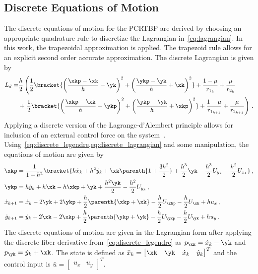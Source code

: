 \subsection{Discrete Equations of Motion}
The discrete equations of motion for the PCRTBP are derived by choosing an appropriate quadrature rule to discretize the Lagrangian in~\cref{eq:lagrangian}. 
In this work, the trapezoidal approximation is applied.
The trapezoid rule allows for an explicit second order accurate approximation.
The discrete Lagrangian is given by
\begin{align}\label{eq:discrete_lagrangian}
	L_d = &\frac{h}{2} \left( \frac{1}{2} \bracket{\left(  \frac{\xkp - \xk}{h} -\yk \right)^2 + \left( \frac{\ykp - \yk}{h} + \xk \right)^2} + \frac{1 - \mu}{r_{1_k}} + \frac{\mu}{r_{2_k}} \right. \nonumber \\ 
		& + \left. \frac{1}{2} \bracket{\left(  \frac{\xkp - \xk}{h} -\ykp \right)^2 + \left( \frac{\ykp - \yk}{h} + \xkp \right)^2} + \frac{1-\mu}{r_{1_{k+1}}} + \frac{\mu}{r_{2_{k+1}}}  \right) \, .
\end{align}
Applying a discrete version of the Lagrange-d'Alembert principle allows for inclusion of an external control force on the system~\cite{marsden2001}.
Using~\cref{eq:discrete_legendre,eq:discrete_lagrangian} and some manipulation, the equations of motion are given by
\begin{subequations}\label{eq:discrete_eoms}
\begin{align}
	\xkp &= \frac{1}{1+ h^2} \bracket{h \dot{x}_k + h^2 \dot{y}_k  + \xk \parenth{1+ \frac{3h^2}{2}} + \frac{h^3}{2} \yk - \frac{h^3}{2} U_{y_k} - \frac{h^2}{2} U_{x_k} } \label{eq:xkp} \, ,\\
	\ykp &= h \dot{y}_k + h \xk - h \xkp + \yk + \frac{h^2 \yk}{2} - \frac{h^2 }{2} U_{y_k} \label{eq:ykp} \, ,\\
	\dot{x}_{k+1} &= \dot{x}_k - 2 \yk + 2 \ykp + \frac{h}{2} \parenth{\xkp + \xk} - \frac{h}{2} U_{\xkp} - \frac{h}{2} U_{\xk} + h u_x \label{eq:xdotkp}\, ,\\
	\dot{y}_{k+1} &= \dot{y}_{k} + 2 \xk - 2 \xkp + \frac{h}{2} \parenth{\ykp + \yk} - \frac{h}{2} U_{\ykp} - \frac{h}{2} U_{\yk} + h u_y \label{eq:ydotkp} \, .
\end{align}
\end{subequations}
The discrete equations of motion are given in the Lagrangian form after applying the discrete fiber derivative from~\cref{eq:discrete_legendre} as \( p_{\xk} = \dot{x}_k - \yk \) and \( p_{\yk} = \dot{y}_k + \xk \).
The state is defined as \( \bar{ x}_k = \begin{bmatrix} \xk & \yk & \dot{x}_k & \dot{y}_k \end{bmatrix}^T\) and the control input is \( \bar{u} = \begin{bmatrix} u_x & u_y \end{bmatrix}^T \).
